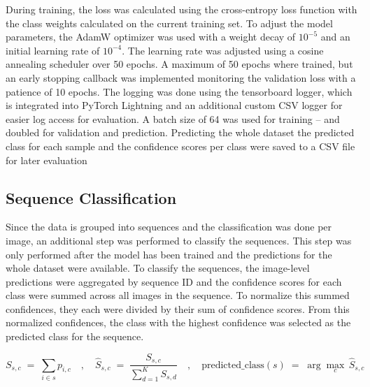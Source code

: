     During training, the loss was calculated using the cross-entropy loss function with the class weights calculated on the current training set.
    To adjust the model parameters, the AdamW optimizer \autocite{loshchilovDecoupledWeightDecay2019} was used with a weight decay of $10^{-5}$ and an initial learning rate of $10^{-4}$.
    The learning rate was adjusted using a cosine annealing scheduler \autocite{loshchilovSGDRStochasticGradient2017} over 50 epochs.
    A maximum of 50 epochs where trained, but an early stopping callback was implemented monitoring the validation loss with a patience of 10 epochs.
    The logging was done using the tensorboard logger, which is integrated into PyTorch Lightning and an additional custom CSV logger for easier log access for evaluation.
    A batch size of 64 was used for training -- and doubled for validation and prediction.
    Predicting the whole dataset the predicted class for each sample and the confidence scores per class were saved to a CSV file for later evaluation

    \subsection{Sequence Classification} 
    Since the data is grouped into sequences and the classification was done per image, an additional step was performed to classify the sequences.
    This step was only performed after the model has been trained and the predictions for the whole dataset were available.
    To classify the sequences, the image-level predictions were aggregated by sequence ID and the confidence scores for each class were summed across all images in the sequence.
    To normalize this summed confidences, they each were divided by their sum of confidence scores.
    From this normalized confidences, the class with the highest confidence was selected as the predicted class for the sequence.
    
    \begin{equation}
        S_{s,c} \;=\; \sum_{i \in s} p_{i,c}
        \quad,\quad
        \hat{S}_{s,c} \;=\; \frac{S_{s,c}}{\sum_{d=1}^{K} S_{s,d}}
        \quad,\quad
        \text{predicted\_class}(s) \;=\; \arg\max_{c}\,\hat{S}_{s,c}
    \end{equation}

